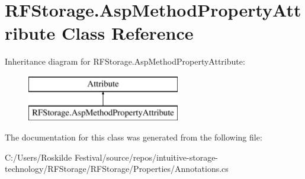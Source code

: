 \hypertarget{class_r_f_storage_1_1_asp_method_property_attribute}{}\section{R\+F\+Storage.\+Asp\+Method\+Property\+Attribute Class Reference}
\label{class_r_f_storage_1_1_asp_method_property_attribute}
Inheritance diagram for R\+F\+Storage.\+Asp\+Method\+Property\+Attribute\+:\begin{figure}[H]
\begin{center}
\leavevmode
\includegraphics[height=2.000000cm]{class_r_f_storage_1_1_asp_method_property_attribute}
\end{center}
\end{figure}


The documentation for this class was generated from the following file\+:\begin{DoxyCompactItemize}
\item 
C\+:/\+Users/\+Roskilde Festival/source/repos/intuitive-\/storage-\/technology/\+R\+F\+Storage/\+R\+F\+Storage/\+Properties/Annotations.\+cs\end{DoxyCompactItemize}
